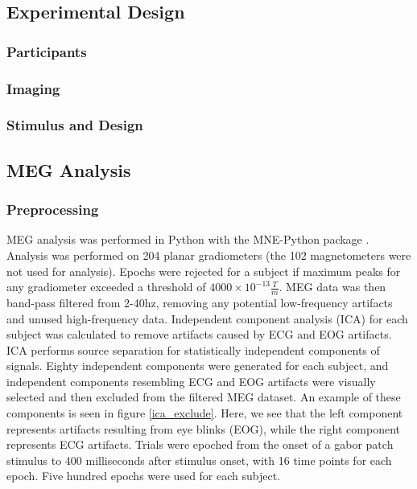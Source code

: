 \documentclass[../main.tex]{subfiles}
\begin{document}
\subsection{Experimental Design}
\subsubsection{Participants}

\subsubsection{Imaging}

\subsubsection{Stimulus and Design}

\subsection{MEG Analysis}
\subsubsection{Preprocessing}
MEG analysis was performed in Python with the MNE-Python package \citep{mne}. Analysis was performed on 204 planar gradiometers (the 102 magnetometers were not used for analysis). Epochs were rejected for a subject if maximum peaks for any gradiometer exceeded a threshold of $4000\times10^{-13}  \frac{T}{m}$. MEG data was then band-pass filtered from 2-40hz, removing any potential low-frequency artifacts and unused high-frequency data. Independent component analysis (ICA) for each subject was calculated to remove artifacts caused by ECG and EOG artifacts. ICA performs source separation for statistically independent components of signals. Eighty independent components were generated for each subject, and independent components resembling ECG and EOG artifacts were visually selected and then excluded from the filtered MEG dataset. An example of these components is seen in figure \ref{ica_exclude}. Here, we see that the left component represents artifacts resulting from eye blinks (EOG), while the right component represents ECG artifacts. Trials were epoched from the onset of a gabor patch stimulus to 400 milliseconds after stimulus onset, with 16 time points for each epoch. Five hundred epochs were used for each subject.
\end{document}
